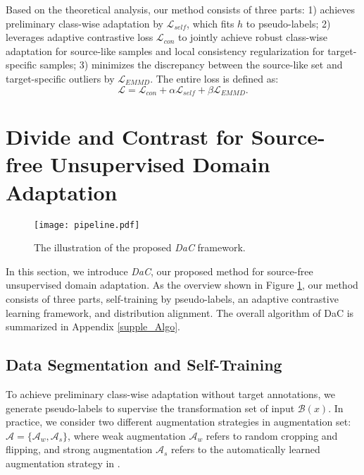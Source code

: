 \documentclass{article}
\newcommand{\modelName}{DaC}
\begin{document}
Based on the theoretical analysis, our method consists of three parts: 1) achieves preliminary class-wise adaptation by $\mathcal{L}_{self}$, which fits $h$ to pseudo-labels; 2) leverages adaptive contrastive loss $\mathcal{L}_{con}$ to jointly achieve robust class-wise adaptation for source-like samples and local consistency regularization for target-specific samples; 3) minimizes the discrepancy between the source-like set and target-specific outliers by $\mathcal{L}_{\textit{EMMD}}$. The entire loss is defined as:
\begin{equation}
    \mathcal{L} =  \mathcal{L}_{con} + \alpha \mathcal{L}_{self}  + \beta \mathcal{L}_{\textit{EMMD}}.
\end{equation}



\section{Divide and Contrast for Source-free Unsupervised Domain Adaptation}\label{sec:method}

\begin{figure}[!htbp]
	\centering
	\texttt{[image: pipeline.pdf]}
\caption{The illustration of the proposed \textit{\modelName{}} framework.}
	\label{fig:overview}
\end{figure}

In this section, we introduce \textit{\modelName{}}, our proposed method for source-free unsupervised domain adaptation. 
As the overview shown in Figure \ref{fig:overview}, our method consists of three parts, self-training by pseudo-labels, an adaptive contrastive learning framework, and distribution alignment. The overall algorithm of DaC is summarized in Appendix \ref{supple_Algo}.

\subsection{Data Segmentation and Self-Training}
\label{sc:self-training}
To achieve preliminary class-wise adaptation without target annotations, we generate pseudo-labels to supervise the transformation set of input $\mathcal{B}(x)$. In practice, we consider two different augmentation strategies in augmentation set: $\mathcal{A} = \{\mathcal{A}_w, \mathcal{A}_s\}$, where weak augmentation $\mathcal{A}_w$ refers to random cropping and flipping, and strong augmentation $\mathcal{A}_s$ refers to the automatically learned augmentation strategy in \cite{autoaugment}. 
\end{document}

